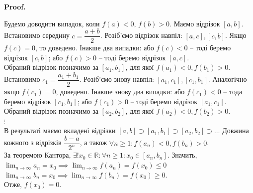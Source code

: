 \documentclass[a4paper, 14pt]{article}
\makeatletter
\def\qed{$\blacksquare$}
\theoremstyle{theoremdd}
\theoremstyle{theoremdd}
\theoremstyle{theoremdd}
\theoremstyle{theoremdd}
\theoremstyle{theoremdd}
\theoremstyle{theoremdd}
\theoremstyle{theoremdd}
\theoremstyle{theoremdd}
\renewenvironment{proof}[1][Proof.\\]{\par
\pushQED{\hfill \qed}%
\normalfont \topsep6\p@\@plus6\p@\relax
\trivlist
\item\relax
{\bfseries
#1\@addpunct{.}}\hspace\labelsep\ignorespaces
}{%
\popQED\endtrivlist\@endpefalse
}
\makeatother
\begin{document}
\begin{proof}
Будемо доводити випадок, коли $f(a) < 0$, $f(b) > 0$. Маємо відрізок $[a,b]$. \\ 
Встановимо середину $c = \dfrac{a+b}{2}$. Розіб'ємо відрізок навпіл: $[a, c], [c, b]$. Якщо $f(c) = 0$, то доведено. Інакше два випадки: або $f(c) < 0$ -- тоді беремо відрізок $[c,b]$; або $f(c) > 0$ -- тоді беремо відрізок $[a,c]$.\\
Обраний відрізок позначимо за $[a_1,b_1]$, для якої $f(a_1) < 0, f(b_1) > 0$.\\
Встановимо $c_1 = \dfrac{a_1+b_1}{2}$. Розіб'ємо знову навпіл: $[a_1,c_1],[c_1,b_1]$. Аналогічно якщо $f(c_1) = 0$, доведено. Інакше знову два випадки: або $f(c_1) < 0$ -- тода беремо відрізок $[c_1,b_1]$; або $f(c_1) > 0$ -- тоді беремо відрізок $[a_1,c_1]$.\\
Обраний відрізок позначимо за $[a_2,b_2]$, для якої $f(a_2) < 0, f(b_2) > 0$.\\
$\vdots$\\
В результаті маємо вкладені відрізки $[a,b] \supset [a_1,b_1] \supset [a_2,b_2] \supset \dots$ Довжина кожного з відрізків $\dfrac{b-a}{2^n}$, а також $\forall n \geq 1: f(a_n) < 0, f(b_n) > 0$.
\\ %
За теоремою Кантора, $\exists! x_0 \in \mathbb{R}: \forall n \geq 1: x_0 \in [a_n,b_n]$. Значить,\\
$\displaystyle\lim_{n \to \infty} a_n = x_0 \implies \displaystyle\lim_{n \to \infty} f(a_n) = f(x_0) \leq 0$\\
$\displaystyle\lim_{n \to \infty} b_n = x_0 \implies \displaystyle\lim_{n \to \infty} f(b_n) = f(x_0) \geq 0$.\\
Отже, $f(x_0) = 0$.
\end{proof}
\end{document}
